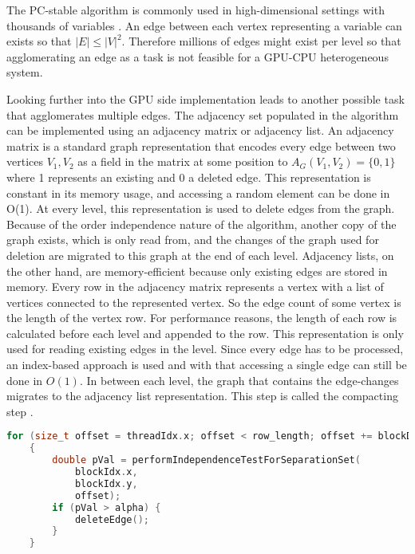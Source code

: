 The PC-stable algorithm is commonly used in high-dimensional settings with thousands of variables \cite{nagarajanFunctionalRelationshipsGenes2010}. An edge between each vertex representing a variable can exists so that $|E| \leq |V|^{2}$. Therefore millions of edges might exist per level so that agglomerating an edge as a task is not feasible for a GPU-CPU heterogeneous system.

Looking further into the GPU side implementation leads to another possible task that agglomerates multiple edges. The adjacency set populated in the algorithm can be implemented using an adjacency matrix or adjacency list. An adjacency matrix is a standard graph representation that encodes every edge between two vertices $V_1, V_2$ as a field in the matrix at some position to $A_G(V_1, V_2) = \{0,1\}$ where 1 represents an existing and 0 a deleted edge. This representation is constant in its memory usage, and accessing a random element can be done in O(1). At every level, this representation is used to delete edges from the graph. Because of the order independence nature of the algorithm, another copy of the graph exists, which is only read from, and the changes of the graph used for deletion are migrated to this graph at the end of each level.
Adjacency lists, on the other hand, are memory-efficient because only existing edges are stored in memory. Every row in the adjacency matrix represents a vertex with a list of vertices connected to the represented vertex. So the edge count of some vertex is the length of the vertex row. For performance reasons, the length of each row is calculated before each level and appended to the row. This representation is only used for reading existing edges in the level. Since every edge has to be processed, an index-based approach is used and with that accessing a single edge can still be done in $O(1)$.
In between each level, the graph that contains the edge-changes migrates to the adjacency list representation. This step is called the compacting step \cite{zarebavaniCuPCCUDAbasedParallel2018}.

\begin{lstlisting}[language=C++, caption=Basic separation set loop in level 1, label=lst:sepsetloopl1]
    for (size_t offset = threadIdx.x; offset < row_length; offset += blockDim.x)
    {
        double pVal = performIndependenceTestForSeparationSet(
            blockIdx.x,
            blockIdx.y,
            offset);
        if (pVal > alpha) {
            deleteEdge();
        }
    }
\end{lstlisting}

